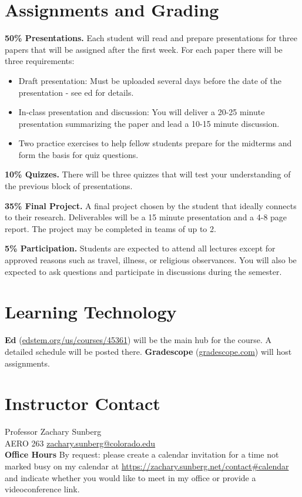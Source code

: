 \documentclass[9pt]{article}
\begin{document}
\section*{Assignments and Grading}

\textbf{50\% Presentations.}
Each student will read and prepare presentations for three papers that will be assigned after the first week. For each paper there will be three requirements:
\begin{itemize}[nosep]
    \item Draft presentation: Must be uploaded several days before the date of the presentation - see ed for details.
    \item In-class presentation and discussion: You will deliver a 20-25 minute presentation summarizing the paper and lead a 10-15 minute discussion.
    \item Two practice exercises to help fellow students prepare for the midterms and form the basis for quiz questions.
\end{itemize}

\textbf{10\% Quizzes.}
There will be three quizzes that will test your understanding of the previous block of presentations.

\textbf{35\% Final Project.}
A final project chosen by the student that ideally connects to their research. Deliverables will be a 15 minute presentation and a 4-8 page report. The project may be completed in teams of up to 2.

\textbf{5\% Participation.}
Students are expected to attend all lectures except for approved reasons such as travel, illness, or religious observances. You will also be expected to ask questions and participate in discussions during the semester.

\section*{Learning Technology}

\textbf{Ed} (\href{https://edstem.org/us/courses/45361}{edstem.org/us/courses/45361}) will be the main hub for the course. A detailed schedule will be posted there.
\textbf{Gradescope} (\url{gradescope.com}) will host assignments.

\section*{Instructor Contact}

Professor Zachary Sunberg\\
AERO 263 \href{mailto://zachary.sunberg@colorado.edu}{zachary.sunberg@colorado.edu}\\
\textbf{Office Hours}
By request: please create a calendar invitation for a time not marked busy on my calendar at \url{ https://zachary.sunberg.net/contact#calendar} and indicate whether you would like to meet in my office or provide a videoconference link. \\
\end{document}

